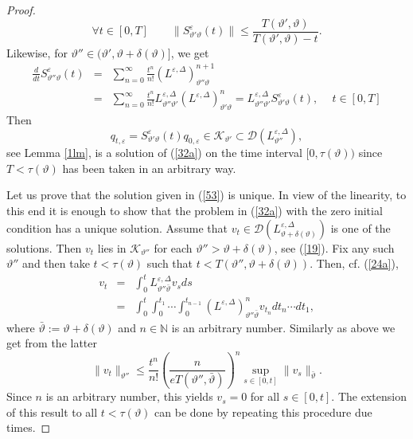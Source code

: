 \documentclass[reqno,11pt]{amsart}
\theoremstyle{definition}
\theoremstyle{remark}
\numberwithin{equation}{section}
\begin{document}
\begin{proof}
\begin{equation}
  \label{51}
\forall t\in [0,T]\qquad \|S^\varepsilon_{\vartheta'\vartheta} (t)
\| \leq \frac{T (\vartheta', \vartheta)}{T (\vartheta', \vartheta) -
t}.
\end{equation}
Likewise, for $\vartheta'' \in (\vartheta' , \vartheta + \delta
(\vartheta)]$, we get
\begin{eqnarray}
  \label{52}
 \frac{d}{dt} S^\varepsilon_{\vartheta''\vartheta} (t) & = &
 \sum_{n=0}^\infty \frac{t^n}{n!} \left( L^{\varepsilon,
\Delta}\right)^{n+1}_{\vartheta''\vartheta}\\[.2cm] & = & \sum_{n=0}^\infty
\frac{t^n}{n!} L^{\varepsilon, \Delta}_{\vartheta''
 \vartheta'} \left( L^{\varepsilon,
\Delta}\right)^n_{\vartheta'\vartheta} = L^{\varepsilon,
\Delta}_{\vartheta''
 \vartheta'} S^\varepsilon_{\vartheta'\vartheta} (t), \ \quad  t\in [0,T] \nonumber
\end{eqnarray}
Then
\begin{equation}
  \label{53}
 q_{t,\varepsilon} = S^\varepsilon_{\vartheta'\vartheta} (t) q_{0, \varepsilon} \in
\mathcal{K}_{\vartheta'} \subset
\mathcal{D}(L^{\varepsilon,\Delta}_{\vartheta''}),
\end{equation}
see Lemma \ref{1lm}, is a solution of (\ref{32a}) on the time
interval $[0, \tau(\vartheta))$ since $T< \tau(\vartheta)$ has been
taken in an arbitrary way.

Let us prove that the solution given in (\ref{53}) is unique. In
view of the linearity, to this end it is enough to show that the
problem in (\ref{32a}) with the zero initial condition has a unique
solution. Assume that $v_t\in
\mathcal{D}(L^{\varepsilon,\Delta}_{\vartheta +\delta(\vartheta)})$
is one of the solutions. Then $v_t$ lies in
$\mathcal{K}_{\vartheta''}$ for each $\vartheta'' > \vartheta +
\delta(\vartheta)$, see (\ref{19}). Fix any such $\vartheta''$ and
then take $t < \tau(\vartheta)$ such that $t< T (\vartheta'',
\vartheta+ \delta(\vartheta))$. Then, cf. (\ref{24a}),
\begin{eqnarray*}
  
v_t & = & \int_0^t L^{\varepsilon, \Delta}_{\vartheta''
 \bar{\vartheta}} v_s d s \\[.2cm]
& = & \int_0^t \int_0^{t_1} \cdots \int_0^{t_{n-1}} \left(
L^{\varepsilon, \Delta}\right)^n_{\vartheta''\bar{\vartheta}}
v_{t_n} d t_n \cdots d t_1, \nonumber
\end{eqnarray*}
where $\bar{\vartheta} := \vartheta + \delta(\vartheta)$ and $n\in
\mathds{N}$ is an arbitrary number. Similarly as above we get from
the latter
\[
\|v_t \|_{\vartheta''} \leq \frac{t^n}{n!} \left(\frac{n}{e T
(\vartheta'',\bar{ \vartheta})}\right)^n \sup_{s\in
[0,t]}\|v_s\|_{\bar{\vartheta}}.
\]
Since $n$ is an arbitrary number, this yields $v_s =0$ for all $s\in
[0,t]$. The extension of this result to all $t <\tau (\vartheta)$
can be done by repeating this procedure due times.
\end{proof}
\end{document}
